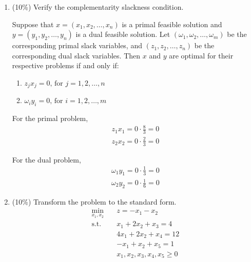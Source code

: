 \documentclass[a4paper,10pt]{article}
\begin{document}
\begin{enumerate}
\begin{enumerate}
        \item (10\%) Verify the complementarity slackness condition.
        {\color{blue}

            Suppose that $x = (x_1, x_2, \ldots, x_n)$ is a {\color{red}primal feasible} solution and $y = (y_1, y_2, \ldots, y_n)$ is a {\color{red}dual feasible} solution. 
            Let $(\omega_1, \omega_2, \ldots, \omega_m)$ be the corresponding primal slack variables, and $(z_1, z_2, \ldots, z_n)$ be the corresponding dual slack variables.
            Then {\color{red} $x$ and $y$ are optimal} for their respective problems if and only if:
            \begin{enumerate}
                \item $z_j x_j = 0 \text{, for } j = 1, 2, \ldots, n$
                \item $\omega_i y_i = 0 \text{, for } i = 1, 2, \ldots, m$
            \end{enumerate} 

            For the primal problem, 
            \begin{align}
                z_1 x_1 = 0 \cdot \frac{8}{3} = 0 \\
                z_2 x_2 = 0 \cdot \frac{2}{3} = 0
            \end{align}

            For the dual problem, 
            \begin{align}
                \omega_1 y_1 = 0 \cdot \frac{1}{3} = 0 \\
                \omega_2 y_2 = 0 \cdot \frac{1}{6} = 0
            \end{align}
        }

        \item (10\%) Transform the problem to the standard form.
        {\color{blue} 
            \begin{equation}
                \begin{aligned}
                    \min_{x_1,x_2} \quad & z = - x_1 - x_2 \\
                    \textrm{s.t.} \quad & x_1 + 2x_2 + x_3 = 4 \\
                        \quad & 4x_1 + 2x_2 + x_4 =  12   \\
                        \quad & -x_1 + x_2 + x_5 = 1  \\
                        \quad & x_1, x_2, x_3, x_4, x_5 \geq 0
                \end{aligned}
            \end{equation}
        }


\end{enumerate}
\end{enumerate}
\end{document}
